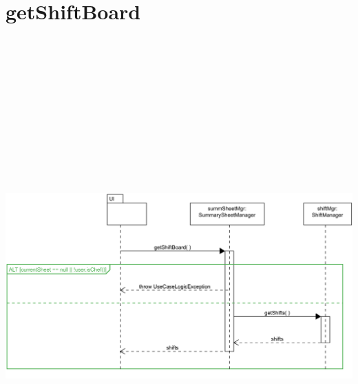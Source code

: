 \section{getShiftBoard}
\centering\includegraphics[max width=\textwidth, max height=190mm]{../resources/img/GCC/DSD/op4.png}

